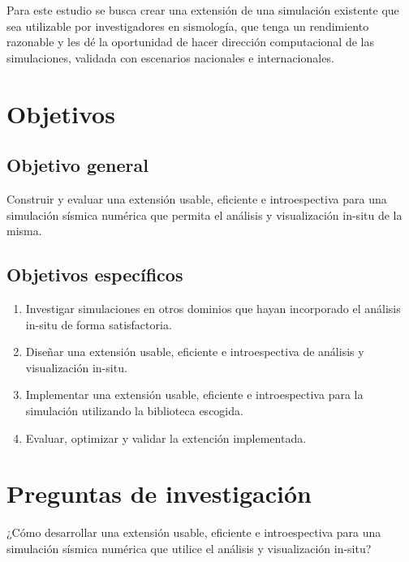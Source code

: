 \documentclass{article}
\begin{document}
Para este estudio se busca crear una extensión de una simulación existente que sea utilizable por investigadores en sismología, que tenga un rendimiento razonable y les dé la oportunidad de hacer dirección computacional de las simulaciones, validada con escenarios nacionales e internacionales.

\section{Objetivos}
\subsection{Objetivo general}
Construir y evaluar una extensión usable, eficiente e introespectiva para una simulación sísmica numérica que permita el análisis y visualización in-situ de la misma.
\subsection{Objetivos específicos}
\begin{enumerate}
  \item Investigar simulaciones en otros dominios que hayan incorporado el análisis in-situ de forma satisfactoria.
  \item Diseñar una extensión usable, eficiente e introespectiva de análisis y visualización in-situ.
  \item Implementar una extensión usable, eficiente e introespectiva para la simulación utilizando la biblioteca escogida.
  \item Evaluar, optimizar y validar la extención implementada.
\end{enumerate}

\section{Preguntas de investigación}
¿Cómo desarrollar una extensión usable, eficiente e introespectiva para una simulación sísmica numérica que utilice el análisis y visualización in-situ?

\printbibliography
\end{document}
